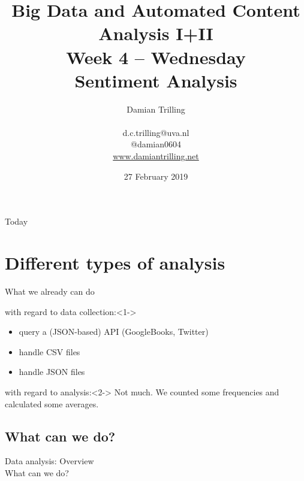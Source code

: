 \documentclass{beamer}
\begin{document}
\title[Big Data and Automated Content Analysis]{\textbf{Big Data and Automated Content Analysis I+II} \\ Week 4 -- Wednesday \\ Sentiment Analysis}
\author[Damian Trilling]{Damian Trilling \\ ~ \\ \footnotesize{d.c.trilling@uva.nl \\@damian0604} \\ \url{www.damiantrilling.net}}
\date{27 February 2019}


\begin{frame}{}
\titlepage
\end{frame}

\begin{frame}{Today}
\tableofcontents
\end{frame}



\section{Different types of analysis}

\begin{frame}{What we already can do}
\begin{block}{with regard to data collection:}<1->
\begin{itemize}
\item query a (JSON-based) API (GoogleBooks, Twitter)
\item handle CSV files
\item handle JSON files 
\end{itemize}
\end{block}

\begin{block}{with regard to analysis:}<2->
Not much. We counted some frequencies and calculated some averages.
\end{block}

\end{frame}



\subsection{What can we do?}
\begin{frame}
Data analysis: Overview\\
What can we do? \\ ~\\
\end{frame}
\end{document}
